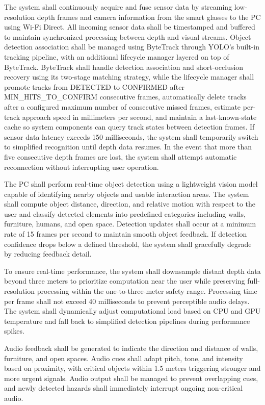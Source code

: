 The system shall continuously acquire and fuse sensor data by streaming low-resolution depth frames and camera information from the smart glasses to the PC using Wi-Fi Direct. All incoming sensor data shall be timestamped and buffered to maintain synchronized processing between depth and visual streams. Object detection association shall be managed using ByteTrack through YOLO's built-in tracking pipeline, with an additional lifecycle manager layered on top of ByteTrack. ByteTrack shall handle detection association and short-occlusion recovery using its two-stage matching strategy, while the lifecycle manager shall promote tracks from DETECTED to CONFIRMED after MIN\_HITS\_TO\_CONFIRM consecutive frames, automatically delete tracks after a configured maximum number of consecutive missed frames, estimate per-track approach speed in millimeters per second, and maintain a last-known-state cache so system components can query track states between detection frames. If sensor data latency exceeds 150 milliseconds, the system shall temporarily switch to simplified recognition until depth data resumes. In the event that more than five consecutive depth frames are lost, the system shall attempt automatic reconnection without interrupting user operation.

The PC shall perform real-time object detection using a lightweight vision model capable of identifying nearby objects and usable interaction areas. The system shall compute object distance, direction, and relative motion with respect to the user and classify detected elements into predefined categories including walls, furniture, humans, and open space. Detection updates shall occur at a minimum rate of 15 frames per second to maintain smooth object feedback. If detection confidence drops below a defined threshold, the system shall gracefully degrade by reducing feedback detail.

To ensure real-time performance, the system shall downsample distant depth data beyond three meters to prioritize computation near the user while preserving full-resolution processing within the one-to-three-meter safety range. Processing time per frame shall not exceed 40 milliseconds to prevent perceptible audio delays. The system shall dynamically adjust computational load based on CPU and GPU temperature and fall back to simplified detection pipelines during performance spikes.

Audio feedback shall be generated to indicate the direction and distance of walls, furniture, and open spaces. Audio cues shall adapt pitch, tone, and intensity based on proximity, with critical objects within 1.5 meters triggering stronger and more urgent signals. Audio output shall be managed to prevent overlapping cues, and newly detected hazards shall immediately interrupt ongoing non-critical audio.

